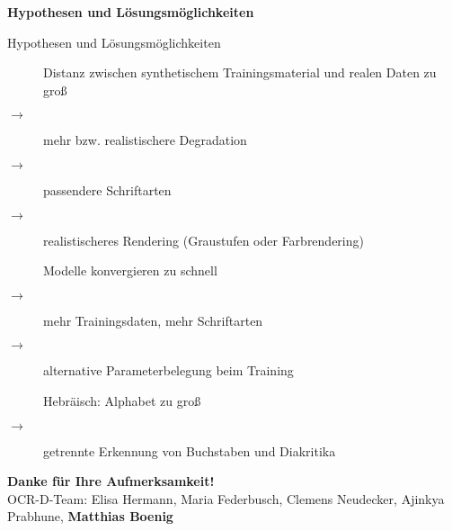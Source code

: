 \documentclass{bbawslides}
\begin{document}
\begin{bbawpart}{\Large\bf Hypothesen und Lösungsmöglichkeiten}
\end{bbawpart}

\begin{bbawslide}{Hypothesen und Lösungsmöglichkeiten}
  \vspace*{7mm}%
  \centerslidestrue%
  \begin{description}
    \item[\labelitemi] Distanz zwischen synthetischem Trainingsmaterial und realen Daten zu groß
    \item[$\rightarrow$] mehr bzw. realistischere Degradation
    \item[$\rightarrow$] passendere Schriftarten
    \item[$\rightarrow$] realistischeres Rendering (Graustufen oder Farbrendering)
    \item[\labelitemi] Modelle konvergieren zu schnell
    \item[$\rightarrow$] mehr Trainingsdaten, mehr Schriftarten
    \item[$\rightarrow$] alternative Parameterbelegung beim Training
    \item[\labelitemi] Hebräisch: Alphabet zu groß
    \item[$\rightarrow$] getrennte Erkennung von Buchstaben und Diakritika
  \end{description}
\end{bbawslide}

\begin{bbawpart}{\Large\bf Danke für Ihre Aufmerksamkeit!\\}
OCR-D-Team: Elisa Hermann, Maria Federbusch, Clemens Neudecker, Ajinkya Prabhune, \textbf{Matthias Boenig}
\end{bbawpart}
\end{document}
